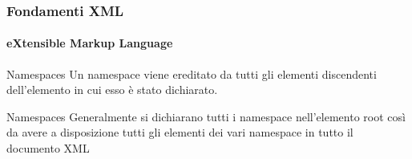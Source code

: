 





\begin{frame}
    \frametitle{Fondamenti XML}
    \framesubtitle{eXtensible Markup Language}
    \addtocounter{nframe}{1}

	\begin{block}{Namespaces}
		Un namespace viene ereditato da tutti gli elementi discendenti dell'elemento in cui esso è stato dichiarato.
	\end{block}

	\begin{block}{Namespaces}
		Generalmente si dichiarano tutti i namespace nell'elemento root così da avere a disposizione tutti gli elementi dei vari namespace in tutto il documento XML
	\end{block}

\end{frame}



